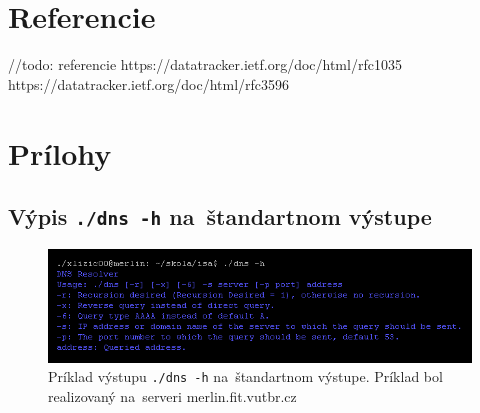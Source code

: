 \documentclass[a4paper, 11pt]{article}
\begin{document}
	\section{Referencie}
	//todo: referencie
	https://datatracker.ietf.org/doc/html/rfc1035
	https://datatracker.ietf.org/doc/html/rfc3596

	\clearpage
	\section{Prílohy}
	
	\subsection{Výpis \texttt{./dns -h} na~štandartnom výstupe}
	\label{subsection:res_A}
	\begin{figure}[ht]
		\centering
		\includegraphics[width=1 \linewidth]{res/A.png}

		\caption{Príklad výstupu \texttt{./dns -h} na~štandartnom výstupe. Príklad bol realizovaný na~serveri \mbox{merlin.fit.vutbr.cz}}
	\end{figure}

	\newpage
\end{document}

